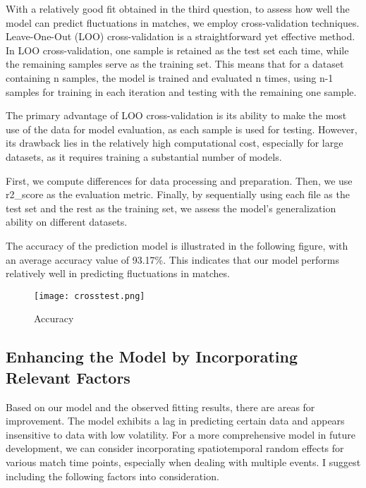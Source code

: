 \documentclass[12pt]{article}
\begin{document}
With a relatively good fit obtained in the third question, to assess how well the model can predict fluctuations in matches, we employ cross-validation techniques. Leave-One-Out (LOO) cross-validation is a straightforward yet effective method. In LOO cross-validation, one sample is retained as the test set each time, while the remaining samples serve as the training set. This means that for a dataset containing n samples, the model is trained and evaluated n times, using n-1 samples for training in each iteration and testing with the remaining one sample.

The primary advantage of LOO cross-validation is its ability to make the most use of the data for model evaluation, as each sample is used for testing. However, its drawback lies in the relatively high computational cost, especially for large datasets, as it requires training a substantial number of models.

First, we compute differences for data processing and preparation. Then, we use r2\_score as the evaluation metric. Finally, by sequentially using each file as the test set and the rest as the training set, we assess the model's generalization ability on different datasets.

The accuracy of the prediction model is illustrated in the following figure, with an average accuracy value of 93.17\%. This indicates that our model performs relatively well in predicting fluctuations in matches.

\begin{figure}[H]
	\centering
	\texttt{[image: crosstest.png]}
	\caption{Accuracy}\label{fig:crosstest}
\end{figure}

\subsection{Enhancing the Model by Incorporating Relevant Factors}

Based on our model and the observed fitting results, there are areas for improvement. The model exhibits a lag in predicting certain data and appears insensitive to data with low volatility. For a more comprehensive model in future development, we can consider incorporating spatiotemporal random effects for various match time points, especially when dealing with multiple events. I suggest including the following factors into consideration.
\end{document}
